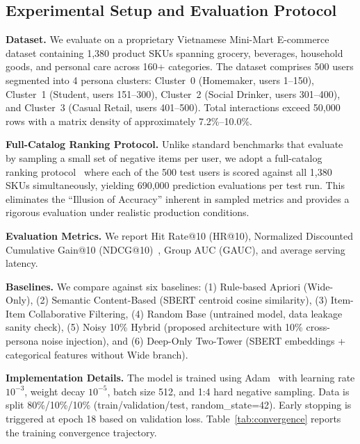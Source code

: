 \documentclass[10pt,conference]{IEEEtran}
\begin{document}
\subsection{Experimental Setup and Evaluation Protocol}
\label{subsec:exp_setup}

\textbf{Dataset.} We evaluate on a proprietary Vietnamese Mini-Mart E-commerce dataset containing 1,380 product SKUs spanning grocery, beverages, household goods, and personal care across 160+ categories. The dataset comprises 500 users segmented into 4 persona clusters: Cluster~0 (Homemaker, users 1--150), Cluster~1 (Student, users 151--300), Cluster~2 (Social Drinker, users 301--400), and Cluster~3 (Casual Retail, users 401--500). Total interactions exceed 50,000 rows with a matrix density of approximately 7.2\%--10.0\%.

\textbf{Full-Catalog Ranking Protocol.} Unlike standard benchmarks that evaluate by sampling a small set of negative items per user, we adopt a full-catalog ranking protocol~\cite{krichene2022sampled} where each of the 500 test users is scored against all 1,380 SKUs simultaneously, yielding 690,000 prediction evaluations per test run. This eliminates the ``Illusion of Accuracy'' inherent in sampled metrics and provides a rigorous evaluation under realistic production conditions.

\textbf{Evaluation Metrics.} We report Hit Rate@10 (HR@10), Normalized Discounted Cumulative Gain@10 (NDCG@10)~\cite{jarvelin2002cumulated}, Group AUC (GAUC), and average serving latency.

\textbf{Baselines.} We compare against six baselines: (1) Rule-based Apriori (Wide-Only), (2) Semantic Content-Based (SBERT centroid cosine similarity), (3) Item-Item Collaborative Filtering, (4) Random Base (untrained model, data leakage sanity check), (5) Noisy 10\% Hybrid (proposed architecture with 10\% cross-persona noise injection), and (6) Deep-Only Two-Tower (SBERT embeddings + categorical features without Wide branch).

\textbf{Implementation Details.} The model is trained using Adam~\cite{kingma2015adam} with learning rate $10^{-3}$, weight decay $10^{-5}$, batch size 512, and 1:4 hard negative sampling. Data is split 80\%/10\%/10\% (train/validation/test, random\_state=42). Early stopping is triggered at epoch 18 based on validation loss. Table~\ref{tab:convergence} reports the training convergence trajectory.
\end{document}
